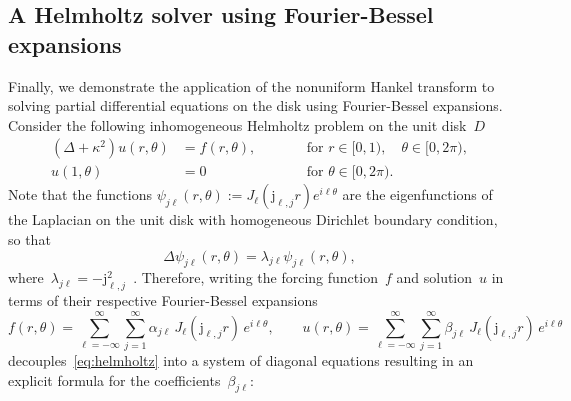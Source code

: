 \subsection{A Helmholtz solver using Fourier-Bessel expansions}

Finally, we demonstrate the application of the nonuniform Hankel transform to
solving partial differential equations on the disk using Fourier-Bessel
expansions. Consider the following inhomogeneous Helmholtz problem on the unit
disk~$D$
\begin{equation}
  \label{eq:helmholtz}
    \begin{aligned}
      (\Delta + \kappa^2) u(r,\theta) &= f(r,\theta), & \qquad &\text{for } r\in
                                                                 [0,1), \quad
                                                                 \theta \in
                                                                 [0,2\pi), \\
      u(1,\theta) &= 0 & \qquad &\text{for } \theta \in [0,2\pi).
    \end{aligned}
\end{equation}
Note that the functions $\psi_{j\ell}(r,\theta) := J_\ell(\mathrm{j}_{\ell,j} r)
e^{i\ell\theta}$ are the eigenfunctions of the Laplacian on the unit disk with
homogeneous Dirichlet boundary condition, so that
\begin{equation}
  \Delta \psi_{j\ell}(r,\theta)
  = \lambda_{j\ell} \psi_{j\ell}(r,\theta),
\end{equation}
where~$\lambda_{j\ell} = -
\mathrm{j}_{\ell,j}^2$~\cite{boyd2011comparing,watson1922treatise}. Therefore,
writing the forcing function~$f$ and solution~$u$ in terms of their respective
Fourier-Bessel expansions
\begin{equation}
  f(r,\theta) 
  = \sum_{\ell=-\infty}^\infty \sum_{j=1}^\infty \alpha_{j\ell} \, 
  J_\ell(\mathrm{j}_{\ell,j}r) \, e^{i\ell\theta}, \qquad
  u(r,\theta) 
  = \sum_{\ell=-\infty}^\infty \sum_{j=1}^\infty \beta_{j\ell} \,
  J_\ell(\mathrm{j}_{\ell,j}r)
  \, e^{i\ell\theta}
\end{equation} 
decouples~\eqref{eq:helmholtz} into a system of diagonal equations resulting in
an explicit formula for the coefficients~$\beta_{j\ell}$:
